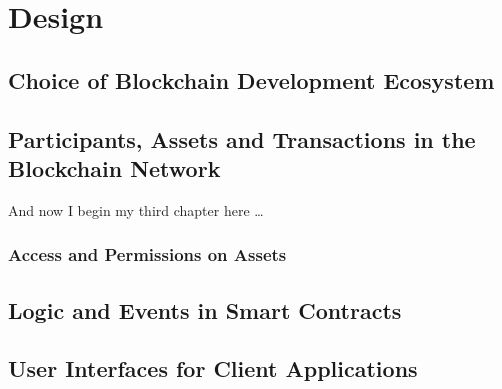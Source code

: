 \chapter{Design}

\section{Choice of Blockchain Development Ecosystem}

\section{Participants, Assets and Transactions in the Blockchain Network}
And now I begin my third chapter here \dots

\subsection{Access and Permissions on Assets}

\section{Logic and Events in Smart Contracts}

\section{User Interfaces for Client Applications}